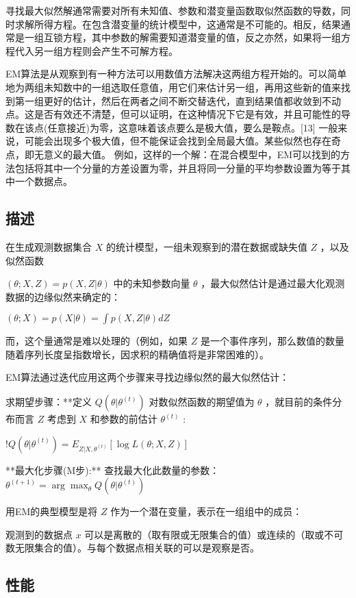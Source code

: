 寻找最大似然解通常需要对所有未知值、参数和潜变量函数取似然函数的导数，同时求解所得方程。在包含潜变量的统计模型中，这通常是不可能的。相反，结果通常是一组互锁方程，其中参数的解需要知道潜变量的值，反之亦然，如果将一组方程代入另一组方程则会产生不可解方程。

EM算法是从观察到有一种方法可以用数值方法解决这两组方程开始的。可以简单地为两组未知数中的一组选取任意值，用它们来估计另一组，再用这些新的值来找到第一组更好的估计，然后在两者之间不断交替迭代，直到结果值都收敛到不动点。这是否有效还不清楚，但可以证明，在这种情况下它是有效，并且可能性的导数在该点(任意接近)为零，这意味着该点要么是极大值，要么是鞍点。[13] 一般来说，可能会出现多个极大值，但不能保证会找到全局最大值。某些似然也存在奇点，即无意义的最大值。 例如，这样的一个解：在混合模型中，EM可以找到的方法包括将其中一个分量的方差设置为零，并且将同一分量的平均参数设置为等于其中一个数据点。

\subsection{描述}

在生成观测数据集合 $X$ 的统计模型，一组未观察到的潜在数据或缺失值 $Z$ ，以及似然函数 

$(\theta; X, Z) = p(X, Z | \theta)$
中的未知参数向量 $\theta$ ，最大似然估计是通过最大化观测数据的边缘似然来确定的：

$(\theta; X) = p(X | \theta) = \int p(X, Z | \theta) dZ$

而，这个量通常是难以处理的（例如，如果 $Z$ 是一个事件序列，那么数值的数量随着序列长度呈指数增长，因求积的精确值将是非常困难的）。

EM算法通过迭代应用这两个步骤来寻找边缘似然的最大似然估计：

求期望步骤：**定义 $Q(\theta | \theta^{(t)})$ 对数似然函数的期望值为 $\theta$ ，就目前的条件分布而言 $Z$ 考虑到 $X$ 和参数的前估计 $\theta^{(t)}$ :

$!Q(\theta | \theta^{(t)}) = E_{Z|X,\theta^{(t)}} [\log L(\theta; X, Z)]$

**最大化步骤(M步):** 查找最大化此数量的参数：
$\theta^{(t+1)} = \arg \max_{\theta} Q(\theta | \theta^{(t)})$

用EM的典型模型是将 $Z$ 作为一个潜在变量，表示在一组组中的成员：

观测到的数据点 $x$ 可以是离散的（取有限或无限集合的值）或连续的（取或不可数无限集合的值）。与每个数据点相关联的可以是观察是否。


\subsection{性能}



